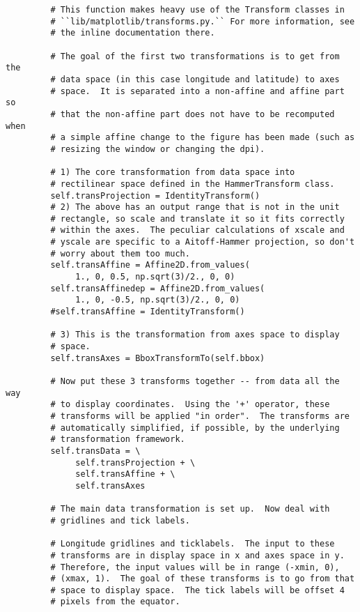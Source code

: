 {\begin{lstlisting}
         # This function makes heavy use of the Transform classes in
         # ``lib/matplotlib/transforms.py.`` For more information, see
         # the inline documentation there.

         # The goal of the first two transformations is to get from the
         # data space (in this case longitude and latitude) to axes
         # space.  It is separated into a non-affine and affine part so
         # that the non-affine part does not have to be recomputed when
         # a simple affine change to the figure has been made (such as
         # resizing the window or changing the dpi).

         # 1) The core transformation from data space into
         # rectilinear space defined in the HammerTransform class.
         self.transProjection = IdentityTransform()
         # 2) The above has an output range that is not in the unit
         # rectangle, so scale and translate it so it fits correctly
         # within the axes.  The peculiar calculations of xscale and
         # yscale are specific to a Aitoff-Hammer projection, so don't
         # worry about them too much.
         self.transAffine = Affine2D.from_values(
              1., 0, 0.5, np.sqrt(3)/2., 0, 0)
         self.transAffinedep = Affine2D.from_values(
              1., 0, -0.5, np.sqrt(3)/2., 0, 0)
         #self.transAffine = IdentityTransform()

         # 3) This is the transformation from axes space to display
         # space.
         self.transAxes = BboxTransformTo(self.bbox)

         # Now put these 3 transforms together -- from data all the way
         # to display coordinates.  Using the '+' operator, these
         # transforms will be applied "in order".  The transforms are
         # automatically simplified, if possible, by the underlying
         # transformation framework.
         self.transData = \
              self.transProjection + \
              self.transAffine + \
              self.transAxes

         # The main data transformation is set up.  Now deal with
         # gridlines and tick labels.

         # Longitude gridlines and ticklabels.  The input to these
         # transforms are in display space in x and axes space in y.
         # Therefore, the input values will be in range (-xmin, 0),
         # (xmax, 1).  The goal of these transforms is to go from that
         # space to display space.  The tick labels will be offset 4
         # pixels from the equator.


\end{lstlisting}}

